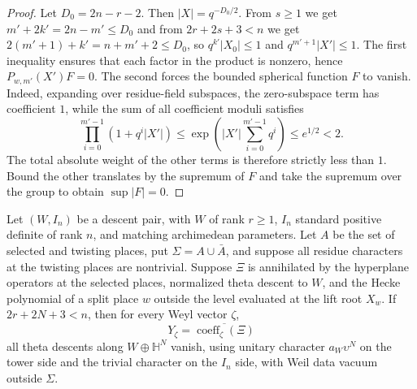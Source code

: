 \begin{proof}
Let $D_0=2n-r-2$. Then $|X|=q^{-D_0/2}$. From $s\ge1$ we get $m'+2k'=2n-m'\le D_0$ and from $2r+2s+3<n$ we get $2(m'+1)+k'=n+m'+2\le D_0$, so $q^{k'}|X_0|\le1$ and $q^{m'+1}|X'|\le1$. The first inequality ensures that each factor in the product is nonzero, hence $P_{w,m'}(X')F=0$. The second forces the bounded spherical function $F$ to vanish. Indeed, expanding over residue-field subspaces, the zero-subspace term has coefficient $1$, while the sum of all coefficient moduli satisfies
\[
 \prod_{i=0}^{m'-1}(1+q^i|X'|)
 \le \exp\!\left(|X'|\sum_{i=0}^{m'-1}q^i\right)
 \le e^{1/2}<2 .
\]
The total absolute weight of the other terms is therefore strictly less than $1$. Bound the other translates by the supremum of $F$ and take the supremum over the group to obtain $\sup|F|=0$.
\end{proof}

\begin{lemma}
\label{lem:c-false-hyperbolic-tower}
\emitthmsource
Let $(W,I_n)$ be a descent pair, with $W$ of rank $r\ge1$, $I_n$ standard positive definite of rank $n$, and matching archimedean parameters. Let $A$ be the set of selected and twisting places, put $\Sigma=A\cup\bar A$, and suppose all residue characters at the twisting places are nontrivial. Suppose $\Xi$ is annihilated by the hyperplane operators at the selected places, normalized theta descent to $W$, and the Hecke polynomial of a split place $w$ outside the level evaluated at the lift root $X_w$. If $2r+2N+3<n$, then for every Weyl vector $\zeta$,
\[
     Y_\zeta=\overline{\operatorname{coeff}_\zeta(\Xi)}
\]
all theta descents along $W\oplus\mathbb H^N$ vanish, using unitary character $a_W\upsilon^N$ on the tower side and the trivial character on the $I_n$ side, with Weil data vacuum outside $\Sigma$.
\end{lemma}

